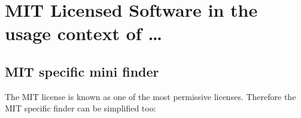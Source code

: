 %
%
%
%
%



\section{MIT Licensed Software in the usage context of \ldots}
% 

\subsection{MIT specific mini finder}
The MIT license is known as one of the most permissive licenses. Therefore the
MIT specific finder can be simplified too:

